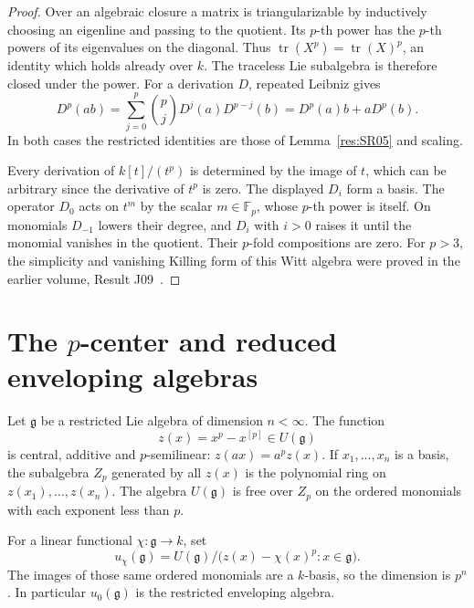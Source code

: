 \begin{proof}
Over an algebraic closure a matrix is triangularizable by
inductively choosing an eigenline and passing to the quotient.
Its \(p\)-th power has the \(p\)-th powers of its eigenvalues
on the diagonal. Thus
\(\operatorname{tr}(X^p)=\operatorname{tr}(X)^p\), an identity
which holds already over \(k\). The traceless Lie subalgebra
is therefore closed under the power. For a derivation \(D\),
repeated Leibniz gives
\[
 D^p(ab)=\sum_{j=0}^p\binom pj D^j(a)D^{p-j}(b)
         =D^p(a)b+aD^p(b).
\]
In both cases the restricted identities are those of
Lemma~\ref{res:SR05} and scaling.

Every derivation of \(k[t]/(t^p)\) is determined by the
image of \(t\), which can be arbitrary since the derivative
of \(t^p\) is zero. The displayed \(D_i\) form a basis.
The operator \(D_0\) acts on \(t^m\) by the scalar
\(m\in\mathbb F_p\), whose \(p\)-th power is itself.
On monomials \(D_{-1}\) lowers their degree, and \(D_i\)
with \(i>0\) raises it until the monomial vanishes in
the quotient. Their \(p\)-fold compositions are zero.
For \(p>3\), the simplicity and vanishing Killing form
of this Witt algebra were proved in the earlier volume,
Result J09~\cite[PDF p.~72]{mg-lie}.
\end{proof}

\section{The \texorpdfstring{\(p\)}{p}-center and reduced enveloping algebras}

\begin{theorem}
\label{res:SR08}
Let \(\mathfrak g\) be a restricted Lie algebra of dimension
\(n<\infty\). The function
\[
 z(x)=x^p-x^{[p]}\in U(\mathfrak g)
\]
is central, additive and \(p\)-semilinear:
\(z(a x)=a^p z(x)\). If \(x_1,\ldots,x_n\) is a basis,
the subalgebra \(Z_p\) generated by all \(z(x)\) is the
polynomial ring on \(z(x_1),\ldots,z(x_n)\).
The algebra \(U(\mathfrak g)\) is free over \(Z_p\) on the
ordered monomials with each exponent less than \(p\).

For a linear functional \(\chi:\mathfrak g\to k\), set
\[
 u_\chi(\mathfrak g)
   = U(\mathfrak g)\big/\bigl(z(x)-\chi(x)^p:x\in\mathfrak g\bigr).
\]
The images of those same ordered monomials are a
\(k\)-basis, so the dimension is \(p^n\). In particular
\(u_0(\mathfrak g)\) is the restricted enveloping algebra.
\end{theorem}


